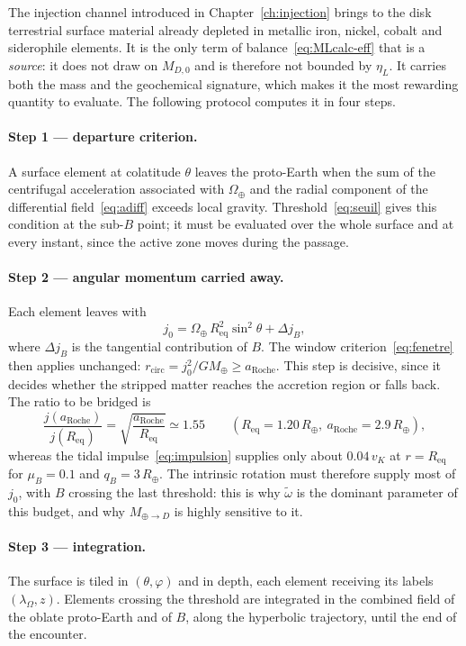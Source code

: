 \documentclass[11pt,a4paper,openany]{report}
\newcommand{\Mt}{M_{\oplus}}
\newcommand{\Rt}{R_{\oplus}}
\newcommand{\Req}{R_{\mathrm{eq}}}
\newcommand{\aR}{a_{\mathrm{Roche}}}
\begin{document}
The injection channel introduced in Chapter~\ref{ch:injection} brings to the disk terrestrial
surface material already depleted in metallic iron, nickel, cobalt and siderophile elements. It is
the only term of balance~\eqref{eq:MLcalc-eff} that is a \emph{source}: it does not draw on
$M_{D,0}$ and is therefore not bounded by $\eta_L$. It carries both the mass and the geochemical
signature, which makes it the most rewarding quantity to evaluate. The following protocol computes
it in four steps.

\paragraph{Step 1 --- departure criterion.} A surface element at colatitude $\theta$ leaves the
proto-Earth when the sum of the centrifugal acceleration associated with $\Omega_\oplus$ and the
radial component of the differential field~\eqref{eq:adiff} exceeds local gravity. Threshold~\eqref{eq:seuil} gives this condition at the sub-$B$ point; it must be evaluated over the
whole surface and at every instant, since the active zone moves during the passage.

\paragraph{Step 2 --- angular momentum carried away.} Each element leaves with
\begin{equation}
j_0=\Omega_\oplus\,\Req^2\sin^2\theta+\Delta j_B,
\label{eq:j0-injection}
\end{equation}
where $\Delta j_B$ is the tangential contribution of $B$. The window
criterion~\eqref{eq:fenetre} then applies unchanged: $r_{\mathrm{circ}}=j_0^2/G\Mt\ge\aR$. This step
is decisive, since it decides whether the stripped matter reaches the accretion region or falls
back. The ratio to be bridged is
\begin{equation}
\frac{j(\aR)}{j(\Req)}=\sqrt{\frac{\aR}{\Req}}\simeq1.55
\qquad(\Req=1.20\,\Rt,\ \aR=2.9\,\Rt),
\label{eq:saut-j}
\end{equation}
whereas the tidal impulse~\eqref{eq:impulsion} supplies only about $0.04\,v_K$ at $r=\Req$ for
$\mu_B=0.1$ and $q_B=3\,\Rt$. The intrinsic rotation must therefore supply most of $j_0$, with $B$
crossing the last threshold: this is why $\tilde\omega$ is the dominant parameter of this budget,
and why $M_{\oplus\to D}$ is highly sensitive to it.

\paragraph{Step 3 --- integration.} The surface is tiled in $(\theta,\varphi)$ and in depth, each
element receiving its labels $(\lambda_\Omega,z)$. Elements crossing the threshold are integrated
in the combined field of the oblate proto-Earth and of $B$, along the hyperbolic trajectory, until
the end of the encounter.
\end{document}
